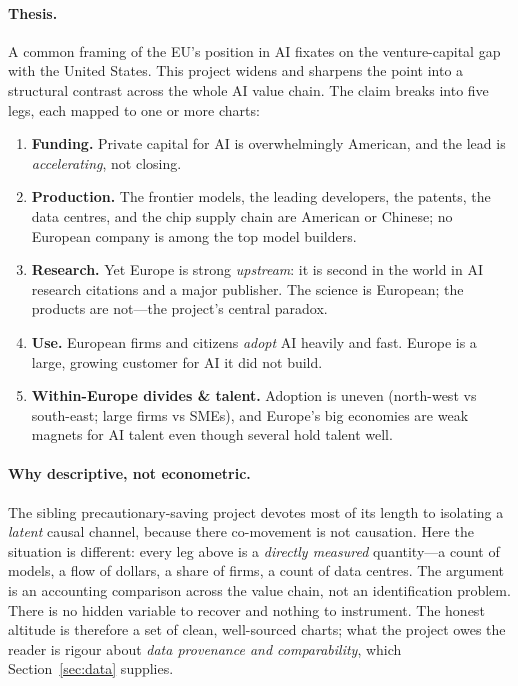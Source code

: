 \documentclass[11pt,a4paper]{article}
\begin{document}
\paragraph{Thesis.} A common framing of the EU's position in AI fixates on the
venture-capital gap with the United States. This project widens and sharpens the
point into a structural contrast across the whole AI value chain. The claim
breaks into five legs, each mapped to one or more charts:
\begin{enumerate}[label=(\Alph*)]
  \item \textbf{Funding.} Private capital for AI is overwhelmingly American, and
        the lead is \emph{accelerating}, not closing.
  \item \textbf{Production.} The frontier models, the leading developers, the
        patents, the data centres, and the chip supply chain are American or
        Chinese; no European company is among the top model builders.
  \item \textbf{Research.} Yet Europe is strong \emph{upstream}: it is second in
        the world in AI research citations and a major publisher. The science is
        European; the products are not---the project's central paradox.
  \item \textbf{Use.} European firms and citizens \emph{adopt} AI heavily and
        fast. Europe is a large, growing customer for AI it did not build.
  \item \textbf{Within-Europe divides \& talent.} Adoption is uneven (north-west
        vs south-east; large firms vs SMEs), and Europe's big economies are weak
        magnets for AI talent even though several hold talent well.
\end{enumerate}

\paragraph{Why descriptive, not econometric.} The sibling precautionary-saving
project devotes most of its length to isolating a \emph{latent} causal channel,
because there co-movement is not causation. Here the situation is different:
every leg above is a \emph{directly measured} quantity---a count of models, a
flow of dollars, a share of firms, a count of data centres. The argument is an
accounting comparison across the value chain, not an identification problem.
There is no hidden variable to recover and nothing to instrument. The honest
altitude is therefore a set of clean, well-sourced charts; what the project owes
the reader is rigour about \emph{data provenance and comparability}, which
Section~\ref{sec:data} supplies.
\end{document}

